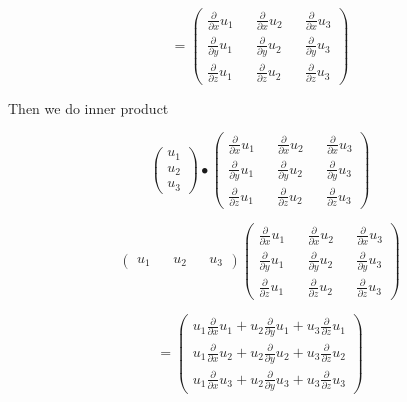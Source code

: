 \documentclass[11pt]{article}
\begin{document}
$$
= \begin{pmatrix}
\frac{\partial}{\partial x} u_1 && \frac{\partial}{\partial x} u_2 && \frac{\partial}{\partial x} u_3 \\
\frac{\partial}{\partial y} u_1 && \frac{\partial}{\partial y} u_2 && \frac{\partial}{\partial y} u_3 \\
\frac{\partial}{\partial z} u_1 && \frac{\partial}{\partial z} u_2 && \frac{\partial}{\partial z} u_3 
\end{pmatrix}
$$

Then we do inner product

$$
\begin{pmatrix}
u_1 \\
u_2 \\
u_3
\end{pmatrix} \bullet \begin{pmatrix}
\frac{\partial}{\partial x} u_1 && \frac{\partial}{\partial x} u_2 && \frac{\partial}{\partial x} u_3 \\
\frac{\partial}{\partial y} u_1 && \frac{\partial}{\partial y} u_2 && \frac{\partial}{\partial y} u_3 \\
\frac{\partial}{\partial z} u_1 && \frac{\partial}{\partial z} u_2 && \frac{\partial}{\partial z} u_3 
\end{pmatrix} 
$$

$$\begin{pmatrix}
u_1 &&
u_2 &&
u_3
\end{pmatrix} \begin{pmatrix}
\frac{\partial}{\partial x} u_1 && \frac{\partial}{\partial x} u_2 && \frac{\partial}{\partial x} u_3 \\
\frac{\partial}{\partial y} u_1 && \frac{\partial}{\partial y} u_2 && \frac{\partial}{\partial y} u_3 \\
\frac{\partial}{\partial z} u_1 && \frac{\partial}{\partial z} u_2 && \frac{\partial}{\partial z} u_3 
\end{pmatrix}  $$

$$=\begin{pmatrix}
u_1 \frac{\partial}{\partial x} u_1 + u_2 \frac{\partial}{\partial y} u_1 + u_3 \frac{\partial}{\partial z} u_1 \\
u_1 \frac{\partial}{\partial x} u_2 + u_2 \frac{\partial}{\partial y} u_2 + u_3 \frac{\partial}{\partial z} u_2 \\
u_1 \frac{\partial}{\partial x} u_3 + u_2 \frac{\partial}{\partial y} u_3 + u_3 \frac{\partial}{\partial z} u_3
\end{pmatrix}
$$
\end{document}

